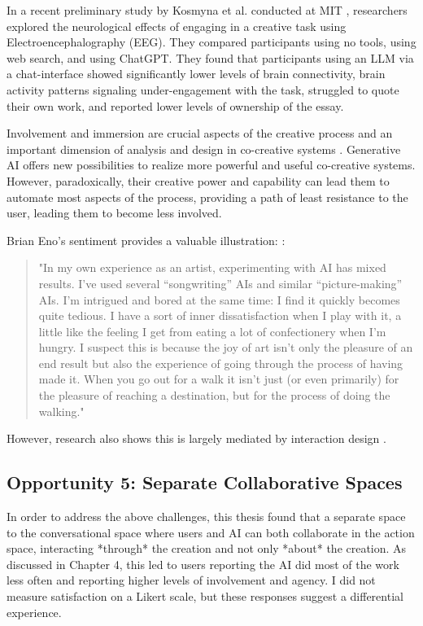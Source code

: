 In a recent preliminary study by Kosmyna et al. conducted at MIT \cite{Kosmyna2025-cm}, researchers explored the neurological effects of engaging in a creative task using Electroencephalography (EEG). They compared participants using no tools, using web search, and using ChatGPT. They found that participants using an LLM via a chat-interface showed significantly lower levels of brain connectivity, brain activity patterns signaling under-engagement with the task, struggled to quote their own work, and reported lower levels of ownership of the essay.

Involvement and immersion are crucial aspects of the creative process \cite{Amabile1996-pt, Csikszentmihalyi1997-ui} and an important dimension of analysis and design in co-creative systems \cite{Davis2016-te, Cherry2014-ty, Rezwana2022-ui, Clark2018-yf, Lawton2023-gd, Yuan2022-kb, Li2024-yh, Kantosalo2015-pk, Resnick2005-fs}. Generative AI offers new possibilities to realize more powerful and useful co-creative systems. However, paradoxically, their creative power and capability can lead them to automate most aspects of the process, providing a path of least resistance to the user, leading them to become less involved.

Brian Eno's sentiment provides a valuable illustration: \cite{Eno2024-rj}:
\begin{quote}
"In my own experience as an artist, experimenting with AI has mixed results. I’ve used several “songwriting” AIs and similar “picture-making” AIs. I’m intrigued and bored at the same time: I find it quickly becomes quite tedious. I have a sort of inner dissatisfaction when I play with it, a little like the feeling I get from eating a lot of confectionery when I’m hungry. I suspect this is because the joy of art isn’t only the pleasure of an end result but also the experience of going through the process of having made it. When you go out for a walk it isn’t just (or even primarily) for the pleasure of reaching a destination, but for the process of doing the walking."
\end{quote}
However, research also shows this is largely mediated by interaction design \cite{Kim2023-wt, Essel2024-qc}.


\subsection{Opportunity 5: Separate Collaborative Spaces}

In order to address the above challenges, this thesis found that a separate space to the conversational space where users and AI can both collaborate in the action space, interacting *through* the creation and not only *about* the creation. As discussed in Chapter 4, this led to users reporting the AI did most of the work less often and reporting higher levels of involvement and agency. I did not measure satisfaction on a Likert scale, but these responses suggest a differential experience.

